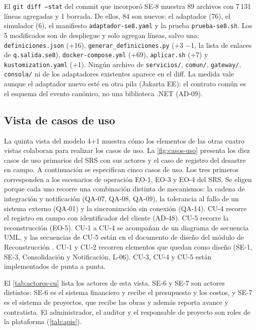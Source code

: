 \documentclass[11pt,letterpaper]{article}
\providecommand{\br}{\discretionary{}{}{}}
\begin{document}
El \texttt{git diff --stat} del commit que incorporó SE-8 muestra 89 archivos con 7\,131 líneas
agregadas y 1 borrada. De ellos, 84 son nuevos: el adaptador (76), el simulador (6), el manifiesto
\texttt{adaptador-\br{}se8.\br{}yaml} y la prueba \texttt{prueba-se8.sh}. Los 5 modificados son de
despliegue y solo agregan líneas, salvo una: \texttt{definiciones.\br{}json} (+16),
\texttt{generar\_\br{}definiciones.py} (+3 $-$1, la lista de enlaces de \texttt{q.salida.se8}),
\texttt{docker-\br{}compose.\br{}yml} (+69), \texttt{aplicar.sh} (+7) y \texttt{kustomization.\br{}yaml} (+1). Ningún
archivo de \texttt{servicios/}, \texttt{comun/}, \texttt{gateway/}, \texttt{consola/} ni de los
adaptadores existentes aparece en el diff. La medida vale aunque el adaptador nuevo esté en otra pila
(Jakarta EE): el contrato común es el esquema del evento canónico, no una biblioteca .NET (AD-09).

\subsection{Vista de casos de uso}
\label{sec:vista-casos-uso}

La quinta vista del modelo 4+1 muestra cómo los elementos de las otras cuatro vistas colaboran para
realizar los casos de uso. La \cref{fig:casos-uso} presenta los diez casos de uso primarios del SRS
con sus actores y el caso de registro del desastre en campo. A continuación se especifican cinco
casos de uso. Los tres primeros corresponden a los escenarios de operación EO-1, EO-3 y EO-4 del
SRS. Se eligen porque cada uno recorre una combinación distinta de mecanismos: la cadena de
integración y notificación (QA-07, QA-08, QA-09), la tolerancia al fallo de un sistema externo
(QA-01) y la sincronización sin conexión (QA-14). CU-4 recorre el registro en campo con
identificador del cliente (AD-48). CU-5 recorre la reconstrucción (EO-5). CU-1 a CU-4 se acompañan de
un diagrama de secuencia UML, y las secuencias de CU-5 están en el documento de diseño del módulo de
Reconstrucción \cite{diseno-rc}. CU-1 y CU-2 recorren elementos que quedan como diseño (SE-1, SE-3,
Consolidación y Notificación, L-06). CU-3, CU-4 y CU-5 están implementados de punta a punta.

El \cref{tab:actores-cu} lista los actores de esta vista. SE-6 y SE-7 son actores distintos: SE-6 es
el sistema financiero y recibe el presupuesto y los costos, y SE-7 es el sistema de proyectos, que
recibe las obras y además reporta avance y contratista. El administrador, el auditor y el responsable
de proyecto son roles de la plataforma (\cref{tab:apis}).
\end{document}
